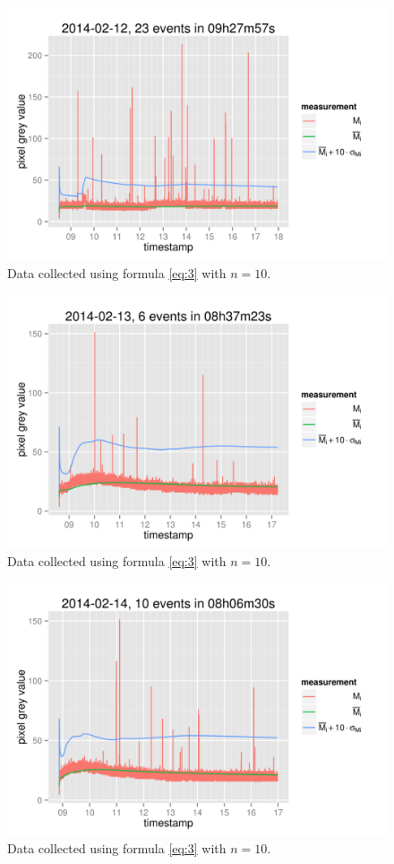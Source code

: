 \documentclass[a4paper,12pt]{article}
\begin{document}
\begin{figure}[h!]
  \centering
  \includegraphics{20140212.png}
  \caption{Data collected using formula \ref{eq:3} with $n=10$.}
\end{figure}

\begin{figure}[h!]
  \centering
  \includegraphics{20140213.png}
  \caption{Data collected using formula \ref{eq:3} with $n=10$.}\label{fig:4}
\end{figure}

\begin{figure}[h!]
  \centering
  \includegraphics{20140214.png}
  \caption{Data collected using formula \ref{eq:3} with $n=10$.}
\end{figure}
\end{document}
